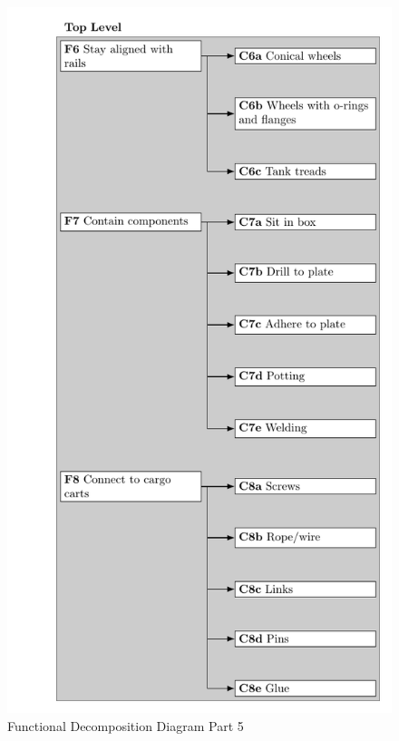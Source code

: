 \documentclass[class=../../report, crop=false]{standalone}
\begin{document}
\begin{figure}[!htb]
	\ContinuedFloat
	\centering
	\includegraphics[trim=10.5cm 0 0 0,scale=0.75]{../../../bin/funcdecomp-5}
	\caption{Functional Decomposition Diagram Part 5}
\end{figure}
\end{document}
